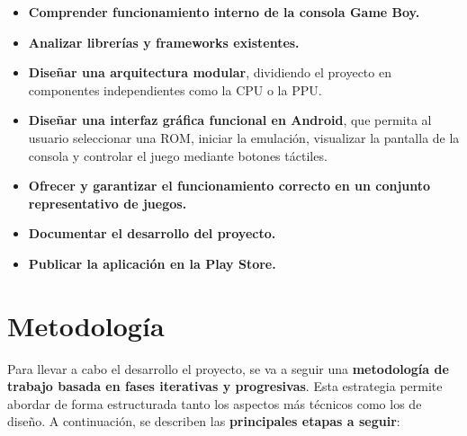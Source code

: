 \begin{itemize}
    \item \textbf{Comprender funcionamiento interno de la consola Game Boy.}
    \item \textbf{Analizar librerías y frameworks existentes.}
    \item \textbf{Diseñar una arquitectura modular}, dividiendo el proyecto en componentes independientes como la CPU o la PPU.
    \item \textbf{Diseñar una interfaz gráfica funcional en Android}, que permita al usuario seleccionar una ROM, iniciar la emulación, visualizar la pantalla de la consola y controlar el juego mediante botones táctiles.
    \item \textbf{Ofrecer y garantizar el funcionamiento correcto en un conjunto representativo de juegos.}
    \item \textbf{Documentar el desarrollo del proyecto.}
    \item \textbf{Publicar la aplicación en la Play Store.}
\end{itemize}

\section{Metodología}

Para llevar a cabo el desarrollo el proyecto, se va a seguir una \textbf{metodología de trabajo basada en fases iterativas y progresivas}. Esta estrategia permite abordar de forma estructurada tanto los aspectos más técnicos como los de diseño. A continuación, se describen las \textbf{principales etapas a seguir}:

